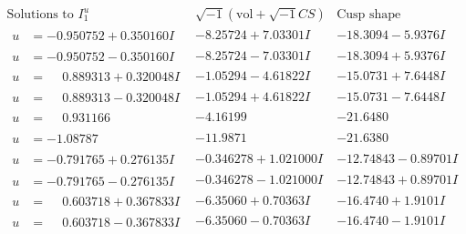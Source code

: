 \documentclass[1p]{elsarticle_modified}
\theoremstyle{definition}
\newcommand{\I}{\sqrt{-1}}
\begin{document}
$$\begin{array}{c|c|c}  
\text{Solutions to }I^u_{1}& \I (\text{vol} + \sqrt{-1}CS) & \text{Cusp shape}\\
 \hline 
\begin{aligned}
u &= -0.950752 + 0.350160 I\end{aligned}
 & -8.25724 + 7.03301 I & -18.3094 - 5.9376 I \\ \hline\begin{aligned}
u &= -0.950752 - 0.350160 I\end{aligned}
 & -8.25724 - 7.03301 I & -18.3094 + 5.9376 I \\ \hline\begin{aligned}
u &= \phantom{-}0.889313 + 0.320048 I\end{aligned}
 & -1.05294 - 4.61822 I & -15.0731 + 7.6448 I \\ \hline\begin{aligned}
u &= \phantom{-}0.889313 - 0.320048 I\end{aligned}
 & -1.05294 + 4.61822 I & -15.0731 - 7.6448 I \\ \hline\begin{aligned}
u &= \phantom{-}0.931166\phantom{ +0.000000I}\end{aligned}
 & -4.16199\phantom{ +0.000000I} & -21.6480\phantom{ +0.000000I} \\ \hline\begin{aligned}
u &= -1.08787\phantom{ +0.000000I}\end{aligned}
 & -11.9871\phantom{ +0.000000I} & -21.6380\phantom{ +0.000000I} \\ \hline\begin{aligned}
u &= -0.791765 + 0.276135 I\end{aligned}
 & -0.346278 + 1.021000 I & -12.74843 - 0.89701 I \\ \hline\begin{aligned}
u &= -0.791765 - 0.276135 I\end{aligned}
 & -0.346278 - 1.021000 I & -12.74843 + 0.89701 I \\ \hline\begin{aligned}
u &= \phantom{-}0.603718 + 0.367833 I\end{aligned}
 & -6.35060 + 0.70363 I & -16.4740 + 1.9101 I \\ \hline\begin{aligned}
u &= \phantom{-}0.603718 - 0.367833 I\end{aligned}
 & -6.35060 - 0.70363 I & -16.4740 - 1.9101 I \\ \hline\begin{aligned}

\end{aligned}
\end{array}$$
\end{document}
